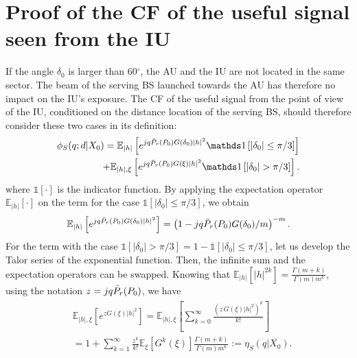 {\appendices

\section{Proof of the CF of the useful signal seen from the IU}
\label{sec:proofcfS0}
If the angle $\delta_0$ is larger than 60$^\circ$, the AU and the IU are not located in the same sector. The beam of the serving BS launched towards the AU has therefore no impact on the IU's exposure. The CF of the useful signal from the point of view of the IU, conditioned on the distance location of the serving BS, should therefore consider these two cases in its definition:
\begin{equation}\label{eq:S_idle_proof}
\begin{split}
    \phi_S(q;d|X_0) = \mathbb E_{|h|}\left[e^{jq \Bar{P}_r(P_0) G(\delta_0) |h|^2} \mathds 1\left[|\delta_0| \leq \pi/3\right] \right]\\
    +\mathbb E_{|h|, \xi}\left[e^{jq \Bar{P}_r(P_0) G(\xi) |h|^2}\mathds 1\left[|\delta_0| >\pi/3\right] \right].
\end{split}
\end{equation}
where $\mathds 1[\cdot]$ is the indicator function. By applying the expectation operator $\mathbb E_{|h|}[\cdot]$ on the term for the case $\mathds 1\left[|\delta_0| \leq \pi/3\right]$, we obtain
\begin{equation}\label{eq:Phi_S_nogain}
    \mathbb E_{|h|}\left[e^{jq \Bar{P}_r(P_0) G(\delta_0) |h|^2} \right] = \left(1-jq \Bar{P}_r(P_0) G(\delta_0)/m\right)^{-m}.
\end{equation}
For the term with the case $\mathds 1\left[|\delta_0| >\pi/3\right] = 1-\mathds 1\left[|\delta_0| \leq \pi/3\right]$, let us develop the Talor series of the exponential function. Then, the infinite sum and the expectation operators can be swapped. Knowing that $\mathbb E_{|h|}\left[|h|^{2k}\right] = \frac{\Gamma(m+k)}{\Gamma(m) m^k}$, using the notation $z = jq \Bar{P}_r(P_0)$, we have
\begin{align}\label{eta_S_def}
\begin{split}
    &\mathbb E_{|h|, \xi}\left[e^{z G(\xi) |h|^2}\right] = \mathbb E_{|h|, \xi}\left[\sum\limits_{k = 0}^\infty \frac{\left(z \,G(\xi) |h|^2\right)^k}{k!}\right]\\
    &= 1+\sum\limits_{k = 1}^\infty \frac{z^k}{k!} \mathbb E_{\xi}\left[G^k(\xi)\right] \frac{\Gamma(m+k)}{\Gamma(m) m^k} := \eta_S(q|X_0).
\end{split}
\end{align}
}
